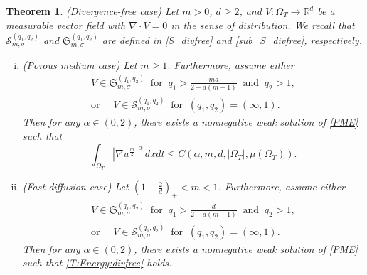 \documentclass{amsart}
\newtheorem{theorem}[defn]{Theorem}
\numberwithin{equation}{section}
\begin{document}
\begin{theorem}\label{T:divfree} (Divergence-free case) Let $m>0$, $d\geq 2$, and $V:\Omega_{T} \to \mathbb{R}^d$ be a measurable vector field with  $\nabla \cdot V =  0$ in the sense of distribution. We recall that $\mathcal{S}_{m,\sigma}^{(q_1,q_2)}$ and $\mathfrak{S}_{m,\sigma}^{(q_1,q_2)}$ are defined in \eqref{S_divfree} and \eqref{sub_S_divfree}, respectively.


\begin{enumerate}[(i)]
  \item (Porous medium case) Let $m \geq 1$. Furthermore, assume either
\begin{equation}\label{T:V:divfree:PME}
\begin{gathered}
	V\in \mathfrak{S}_{m,\sigma}^{(q_1, q_2)}\  \text{ for } \
	q_1 > \frac{md}{2+d(m-1)} \ \text{ and } \ q_2 > 1, \\
	\text{or } \quad V\in \mathcal{S}_{m,\sigma}^{(q_1, q_2)}\  \text{ for } \
	(q_1, q_2) = (\infty,1).
\end{gathered}
\end{equation}
Then for any $\alpha \in (0,2)$, there exists a nonnegative weak solution of \eqref{PME} such that
\begin{equation}\label{T:Energy:divfree}
\int_{\Omega_{T}} \left|\nabla u^{\frac{m}{2}}\right|^{\alpha} \,dxdt \leq C\left(\alpha, m, d, |\Omega_T|, \mu(\Omega_{T})\right).
\end{equation}
  \item (Fast diffusion case) Let $(1-\frac{2}{d})_{+} < m < 1$.  Furthermore, assume either
\begin{equation}\label{T:V:divfree:FDE}
\begin{gathered}
	V\in \mathfrak{S}_{m,\sigma}^{(q_1, q_2)}
	\ \text{ for } \ q_1 > \frac{d}{2+d(m-1)} \ \text{ and } \ q_2>1,\\
	\text{or } \quad V\in \mathcal{S}_{m,\sigma}^{(q_1, q_2)}\  \text{ for } \
	(q_1, q_2) = (\infty,1).	
\end{gathered}
\end{equation}
Then for any $\alpha \in (0,2)$, there exists a nonnegative weak solution of \eqref{PME} such that \eqref{T:Energy:divfree} holds.
\end{enumerate}	
\end{theorem}
\end{document}
